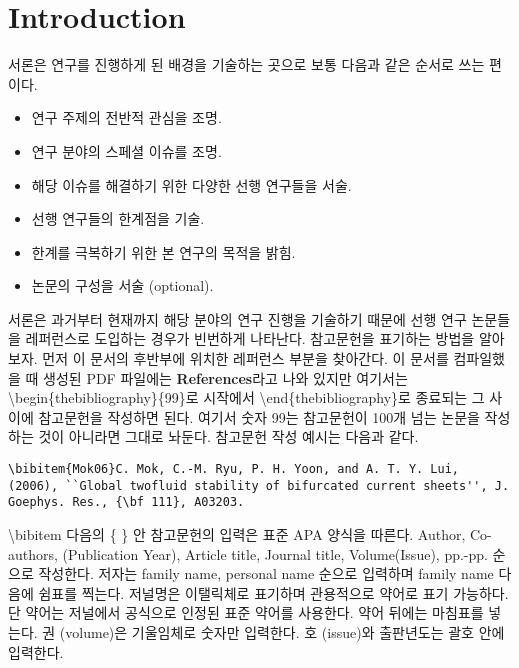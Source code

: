 \documentclass{gshs_thesis}
\begin{document}
\cleardoublepage
\clearpage
\listoftables  %

\cleardoublepage
\clearpage
\listoffigures	%


\cleardoublepage
\clearpage
\renewcommand{\thepage}{\arabic{page}}
\setcounter{page}{1}



\section{Introduction}

서론은 연구를 진행하게 된 배경을 기술하는 곳으로 보통 다음과 같은 순서로 쓰는 편이다.
\begin{itemize}
\item{연구 주제의 전반적 관심을 조명.}
\item{연구 분야의 스페셜 이슈를 조명.}
\item{해당 이슈를 해결하기 위한 다양한 선행 연구들을 서술.}
\item{선행 연구들의 한계점을 기술.}
\item{한계를 극복하기 위한 본 연구의 목적을 밝힘.}
\item{논문의 구성을 서술 (optional).}
\end{itemize}
서론은 과거부터 현재까지 해당 분야의 연구 진행을 기술하기 때문에 선행 연구 논문들을 레퍼런스로 도입하는 경우가 빈번하게 나타난다.  참고문헌을 표기하는 방법을 알아보자. 먼저 이 문서의 후반부에 위치한 레퍼런스 부분을 찾아간다. 이 문서를 컴파일했을 때 생성된 PDF 파일에는 {\bf References}라고 나와 있지만 여기서는 {\textbackslash}begin\{thebibliography\}\{99\}로 시작에서 {\textbackslash}end\{thebibliography\}로 종료되는 그 사이에 참고문헌을 작성하면 된다. 여기서 숫자 99는 참고문헌이 100개 넘는 논문을 작성하는 것이 아니라면 그대로 놔둔다. 참고문헌 작성 예시는 다음과 같다.
\begin{lstlisting}
\bibitem{Mok06}C. Mok, C.-M. Ryu, P. H. Yoon, and A. T. Y. Lui, (2006), ``Global twofluid stability of bifurcated current sheets'', J. Goephys. Res., {\bf 111}, A03203.
\end{lstlisting}
{\textbackslash}bibitem 다음의 \{ \} 안 참고문헌의 입력은 표준 APA 양식을 따른다. Author, Co-authors, (Publication Year), Article title, Journal title, Volume(Issue), pp.-pp. 순으로 작성한다. 저자는 family name, personal name 순으로 입력하며 family name 다음에 쉼표를 찍는다. 저널명은 이탤릭체로 표기하며 관용적으로 약어로 표기 가능하다. 단 약어는 저널에서 공식으로 인정된 표준 약어를 사용한다. 약어 뒤에는 마침표를 넣는다. 권 (volume)은 기울임체로 숫자만 입력한다. 호 (issue)와 출판년도는 괄호 안에 입력한다.
\end{document}
